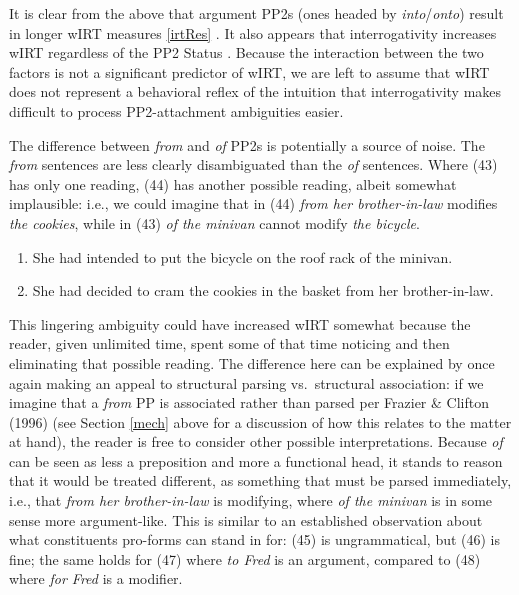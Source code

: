 \documentclass[12pt,oneside]{book}
\providecommand{\tightlist}{%
  \setlength{\itemsep}{0pt}\setlength{\parskip}{0pt}}
\begin{document}
It is clear from the above that  argument PP2s  (ones headed by \emph{into}/\emph{onto}) result in longer wIRT measures  \ref{irtRes} \added{)}. It also appears that interrogativity increases wIRT  regardless of the PP2 Status . Because the interaction between the two factors is not a significant predictor of wIRT, we are left to assume that wIRT does not represent a behavioral reflex of the intuition that interrogativity makes difficult to process PP2-attachment ambiguities easier.

The difference between \emph{from} and \emph{of} PP2s is potentially a source of noise. The \emph{from} sentences are less clearly disambiguated than the \emph{of} sentences. Where (43) has only one reading, (44) has another possible reading, albeit somewhat implausible: i.e., we could imagine that in (44) \emph{from her brother-in-law} modifies \emph{the cookies}, while in (43) \emph{of the minivan} cannot modify \emph{the bicycle}.

\begin{enumerate}
\def\labelenumi{(\arabic{enumi})}
\setcounter{enumi}{42}
\tightlist
\item
  She had intended to put the bicycle on the roof rack of the minivan.
\item
  She had decided to cram the cookies in the basket from her brother-in-law.
\end{enumerate}

This lingering ambiguity could have increased wIRT somewhat because the reader, given unlimited time,  spent some of that time noticing and then eliminating that possible reading. The difference here can be explained by once again making an appeal to structural parsing vs.~structural association: if we imagine that a \emph{from} PP is associated rather than parsed per Frazier \& Clifton (1996) (see Section \ref{mech} above for a discussion of how this relates to the matter at hand), the reader is free to consider other possible interpretations. Because \emph{of} can be seen as less a preposition and more a functional head, it stands to reason that it would be treated different, as something that must be parsed immediately, i.e., that \emph{from her brother-in-law} is modifying, where \emph{of the minivan} is in some sense more argument-like. This is similar to an established observation about what constituents pro-forms can stand in for: (45) is ungrammatical, but (46) is fine; the same holds for (47) where \emph{to Fred} is an argument, compared to (48) where \emph{for Fred} is a modifier.
\end{document}
